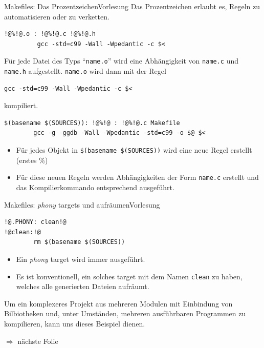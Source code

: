 \documentclass[xcolor=dvipsnames]{beamer}
\newcounter{lecturecounter}
\begin{document}
\begin{frame}[fragile]{Makefiles: Das Prozentzeichen}{Vorlesung }
Das Prozentzeichen erlaubt es, Regeln zu automatisieren oder zu verketten.
\begin{block}{}
\begin{lstlisting}[basicstyle=\ttfamily\scriptsize]
!@%!@.o : !@%!@.c !@%!@.h
         gcc -std=c99 -Wall -Wpedantic -c $<
\end{lstlisting}
Für jede Datei des Typs ``\verb|name.o|'' wird eine Abhängigkeit von \verb|name.c| und \verb|name.h| aufgestellt. \verb|name.o| wird dann mit der Regel
\begin{verbatim}
gcc -std=c99 -Wall -Wpedantic -c $<
\end{verbatim}
kompiliert.
\end{block}
\begin{block}{}
\begin{lstlisting}
$(basename $(SOURCES)): !@%!@ : !@%!@.c Makefile
        gcc -g -ggdb -Wall -Wpedantic -std=c99 -o $@ $<
\end{lstlisting}
\begin{itemize}
  \item{Für jedes Objekt in \verb|$(basename $(SOURCES))| wird eine neue Regel erstellt (erstes \%)}
  \item{Für diese neuen Regeln werden Abhängigkeiten der Form \verb|name.c| erstellt und das Kompilierkommando entsprechend ausgeführt.}
\end{itemize}
\end{block}
\end{frame}

\begin{frame}[fragile]{Makefiles: \emph{phony} targets und aufräumen}{Vorlesung }
\begin{lstlisting}[basicstyle=\ttfamily\scriptsize]
!@.PHONY: clean!@
!@clean:!@
        rm $(basename $(SOURCES))
\end{lstlisting}
\begin{block}{}
  \begin{itemize}
    \item{Ein \emph{phony} target wird immer ausgeführt.}
    \item{Es ist konventionell, ein solches target mit dem Namen \verb|clean| zu haben, welches alle generierten Dateien aufräumt.}
  \end{itemize}
\end{block}
\begin{block}{}
  Um ein komplexeres Projekt aus mehreren Modulen mit Einbindung von Bilbiotheken und, unter Umständen, mehreren ausführbaren Programmen zu kompilieren, kann uns dieses Beispiel dienen.
\end{block}
$\Rightarrow$ nächste Folie
\end{frame}
\end{document}
